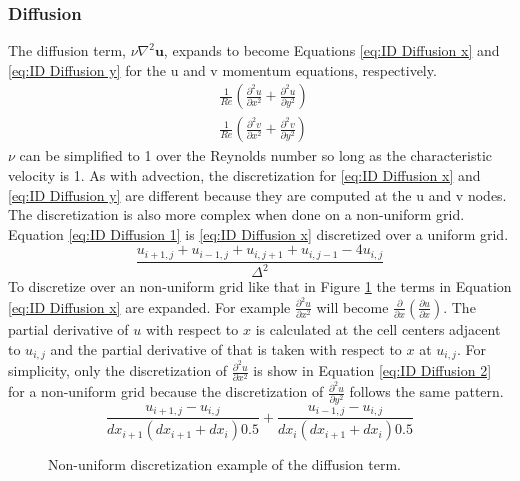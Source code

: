 \documentclass[onehalf,11pt]{beavtex}
\begin{document}
\subsubsection{Diffusion}\label{ID:Diffusion}
The diffusion term, $\nu \nabla^2 \textbf{u}$, expands to become Equations \eqref{eq:ID Diffusion x} and \eqref{eq:ID Diffusion y} for the u and v momentum equations, respectively.
\begin{align}
& \frac{1}{Re}\left(\frac{\partial^2 u}{\partial x^2} + \frac{\partial^2 u}{\partial y^2}\right)\label{eq:ID Diffusion x} \\
& \frac{1}{Re}\left(\frac{\partial^2 v}{\partial x^2} + \frac{\partial^2 v}{\partial y^2}\right)\; \label{eq:ID Diffusion y}
\end{align}
$\nu$ can be simplified to 1 over the Reynolds number so long as the characteristic velocity is 1. 
As with advection, the discretization for \eqref{eq:ID Diffusion x} and \eqref{eq:ID Diffusion y} are different because they are computed at the u and v nodes.
The discretization is also more complex when done on a non-uniform grid.
Equation \eqref{eq:ID Diffusion 1} is \eqref{eq:ID Diffusion x} discretized over a uniform grid.
\begin{equation}
\frac{u_{i+1,j} + u_{i-1,j} + u_{i,j+1} + u_{i,j-1} - 4u_{i,j}}{\Delta^2}\label{eq:ID Diffusion 1}
\end{equation} 
To discretize over an non-uniform grid like that in Figure \ref{fig:ID diffusion} the terms in Equation \eqref{eq:ID Diffusion x} are expanded.
For example $\frac{\partial^2 u}{\partial x^2}$ will become $\frac{\partial}{\partial x}\left(\frac{\partial u}{\partial x}\right)$.
The partial derivative of $u$ with respect to $x$ is calculated at the cell centers adjacent to $u_{i,j}$ and the partial derivative of that is taken with respect to $x$ at $u_{i,j}.$
For simplicity, only the discretization of $\frac{\partial^2 u}{\partial x^2}$ is show in Equation \eqref{eq:ID Diffusion 2} for a non-uniform grid because the discretization of $\frac{\partial^2 u}{\partial y^2}$ follows the same pattern.
\begin{equation}
\frac{u_{i+1,j} - u_{i,j}}{dx_{i+1}(dx_{i+1}+dx_i)0.5} + \frac{u_{i-1,j} - u_{i,j}}{dx_{i}(dx_{i+1}+dx_i)0.5}
\label{eq:ID Diffusion 2}
\end{equation}
\begin{figure}[htb]
	\centering
	
	\caption{Non-uniform discretization example of the diffusion term.}
	\label{fig:ID diffusion}
\end{figure}
\end{document}
